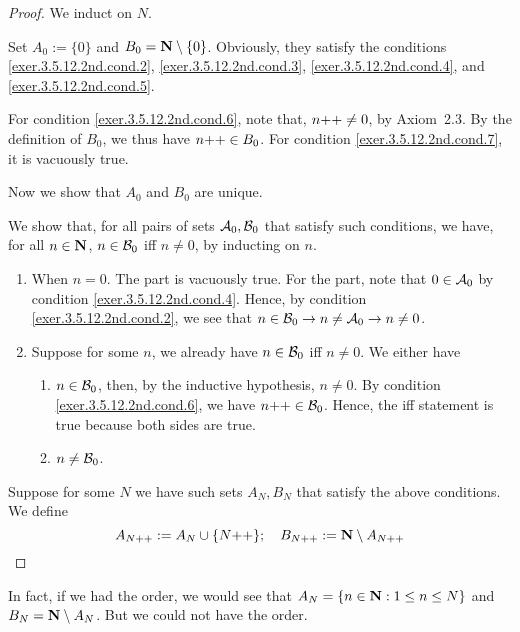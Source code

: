 \begin{proof}
	We induct on $N$.
	
	\mybcbox Set $A_0 := \{0\}$ and $B_0 = \mathbf{N} \setminus \{0\}$. Obviously, they satisfy the conditions \ref{exer.3.5.12.2nd.cond.2}, \ref{exer.3.5.12.2nd.cond.3}, \ref{exer.3.5.12.2nd.cond.4}, and \ref{exer.3.5.12.2nd.cond.5}.
	
	For condition \ref{exer.3.5.12.2nd.cond.6}, note that, $n{+}{+} \ne 0$, by Axiom~2.3. By the definition of $B_0$, we thus have $n{+}{+} \in B_0$. For condition \ref{exer.3.5.12.2nd.cond.7}, it is vacuously true.
	
	Now we show that $A_0$ and $B_0$ are unique. 
	
	\begingroup
	\def\azro{{\cal A}_0}
	\def\bzro{{\cal B}_0}
	We show that, for all pairs of sets $\azro,\bzro$ that satisfy such conditions, we have, for all $n \in \mathbf{N}$, $n \in \bzro$ iff $n \ne 0$, by inducting on $n$.
	\begin{enumerate}
		\item When $n = 0$. The \myifbox part is vacuously true. For the \myoifbox part, note that $0 \in \azro$ by condition \ref{exer.3.5.12.2nd.cond.4}. Hence, by condition \ref{exer.3.5.12.2nd.cond.2}, we see that $n \in \bzro \to n \ne \azro \to n \ne 0$.
		
		\item Suppose for some $n$, we already have $n \in \bzro$ iff $n \ne 0$. We either have 
		\begin{enumerate}
			\item $n \in \bzro$, then, by the inductive hypothesis, $n \ne 0$. By condition \ref{exer.3.5.12.2nd.cond.6}, we have $\successor{n} \in \bzro$. Hence, the iff statement is true because both sides are true.
			\item $n \ne \bzro$. 
		\end{enumerate}
	\end{enumerate}
	\endgroup
	
	\myisbox Suppose for some $N$ we have such sets $A_N,B_N$ that satisfy the above conditions. We define
	\[
	A_{N{+}{+}} := A_N \cup \{N{+}{+}\}; \quad B_{N{+}{+}} := \mathbf{N} \setminus A_{N{+}{+}}
	\]
\end{proof}

In fact, if we had the order, we would see that $A_N = \{n \in \mathbf{N} : 1 \le n \le N\}$ and $B_N = \mathbf{N} \setminus A_N$. But we could not have the order.


